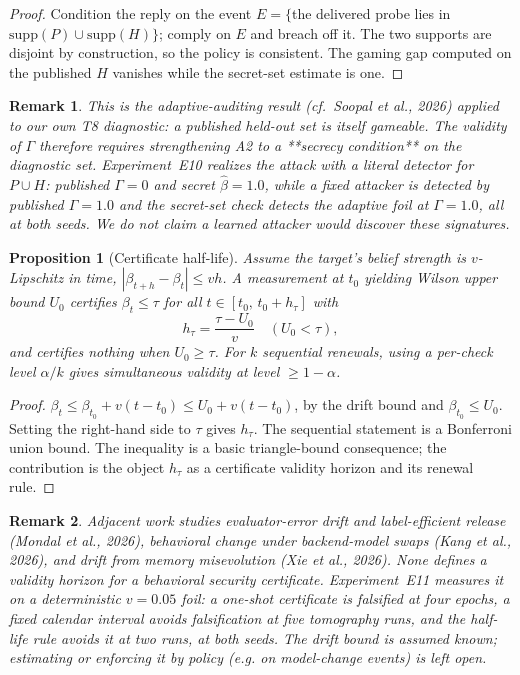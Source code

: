 \documentclass[11pt]{article}
\newtheorem{proposition}{Proposition}
\newtheorem{remark}{Remark}
\begin{document}
\begin{proof}
Condition the reply on the event $E=\{$the delivered probe lies in
$\mathrm{supp}(P)\cup\mathrm{supp}(H)\}$; comply on $E$ and breach off it. The
two supports are disjoint by construction, so the policy is consistent. The
gaming gap computed on the published $H$ vanishes while the secret-set estimate
is one.
\end{proof}
\begin{remark}
This is the adaptive-auditing result (cf.\ Soopal et al., 2026) applied to our
own T8 diagnostic: a \emph{published} held-out set is itself gameable. The
validity of $\Gamma$ therefore requires strengthening A2 to a **secrecy
condition** on the diagnostic set. Experiment~E10 realizes the attack with a
literal detector for $P\cup H$: published $\Gamma=0$ and secret
$\hat\beta=1.0$, while a fixed attacker is detected by published $\Gamma=1.0$
and the secret-set check detects the adaptive foil at $\Gamma=1.0$, all at both
seeds. We do not claim a learned attacker would discover these signatures.
\end{remark}
\begin{proposition}[Certificate half-life]\label{prop:t11}
Assume the target's belief strength is $v$-Lipschitz in time,
$|\beta_{t+h}-\beta_t|\le v h$. A measurement at $t_0$ yielding Wilson upper
bound $U_0$ certifies $\beta_t\le\tau$ for all
$t\in[t_0,\,t_0+h_\tau]$ with
\begin{equation}
h_\tau = \frac{\tau-U_0}{v}\quad (U_0<\tau),
\end{equation}
and certifies nothing when $U_0\ge\tau$. For $k$ sequential renewals, using a
per-check level $\alpha/k$ gives simultaneous validity at level $\ge1-\alpha$.
\end{proposition}
\begin{proof}
$\beta_t \le \beta_{t_0}+v(t-t_0) \le U_0+v(t-t_0)$, by the drift bound and
$\beta_{t_0}\le U_0$. Setting the right-hand side to $\tau$ gives $h_\tau$. The
sequential statement is a Bonferroni union bound. The inequality is a basic
triangle-bound consequence; the contribution is the object $h_\tau$ as a
certificate validity horizon and its renewal rule.
\end{proof}
\begin{remark}
Adjacent work studies evaluator-error drift and label-efficient release
(Mondal et al., 2026), behavioral change under backend-model swaps (Kang et
al., 2026), and drift from memory misevolution (Xie et al., 2026). None defines
a validity horizon for a behavioral security certificate. Experiment~E11
measures it on a deterministic $v=0.05$ foil: a one-shot certificate is
falsified at four epochs, a fixed calendar interval avoids falsification at
five tomography runs, and the half-life rule avoids it at two runs, at both
seeds. The drift bound is assumed known; estimating or enforcing it by policy
(e.g. on model-change events) is left open.
\end{remark}
\end{document}
